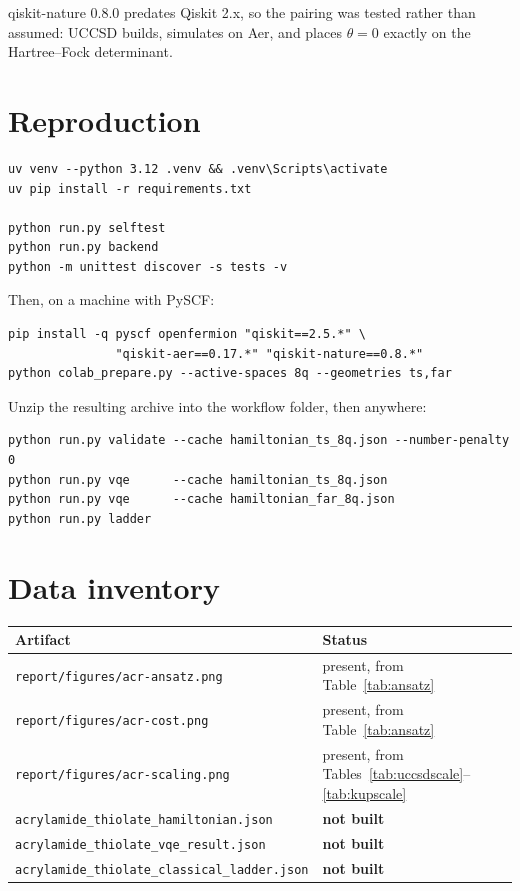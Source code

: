 \documentclass[11pt,a4paper]{article}
\newcommand{\code}[1]{\texttt{\small #1}}
\begin{document}
qiskit-nature 0.8.0 predates Qiskit 2.x, so the pairing was tested rather than
assumed: UCCSD builds, simulates on Aer, and places $\theta = 0$ exactly on the
Hartree--Fock determinant.

\section{Reproduction}

\begin{verbatim}
uv venv --python 3.12 .venv && .venv\Scripts\activate
uv pip install -r requirements.txt

python run.py selftest
python run.py backend
python -m unittest discover -s tests -v
\end{verbatim}

Then, on a machine with PySCF:

\begin{verbatim}
pip install -q pyscf openfermion "qiskit==2.5.*" \
               "qiskit-aer==0.17.*" "qiskit-nature==0.8.*"
python colab_prepare.py --active-spaces 8q --geometries ts,far
\end{verbatim}

Unzip the resulting archive into the workflow folder, then anywhere:

\begin{verbatim}
python run.py validate --cache hamiltonian_ts_8q.json --number-penalty 0
python run.py vqe      --cache hamiltonian_ts_8q.json
python run.py vqe      --cache hamiltonian_far_8q.json
python run.py ladder
\end{verbatim}

\section{Data inventory}

\begin{center}
\small
\begin{tabular}{ll}
\toprule
Artifact & Status \\
\midrule
\code{report/figures/acr-ansatz.png}   & present, from Table~\ref{tab:ansatz} \\
\code{report/figures/acr-cost.png}     & present, from Table~\ref{tab:ansatz} \\
\code{report/figures/acr-scaling.png}  & present, from Tables~\ref{tab:uccsdscale}--\ref{tab:kupscale} \\
\code{acrylamide\_thiolate\_hamiltonian.json} & \textbf{not built} \\
\code{acrylamide\_thiolate\_vqe\_result.json} & \textbf{not built} \\
\code{acrylamide\_thiolate\_classical\_ladder.json} & \textbf{not built} \\
\bottomrule
\end{tabular}
\end{center}
\end{document}
